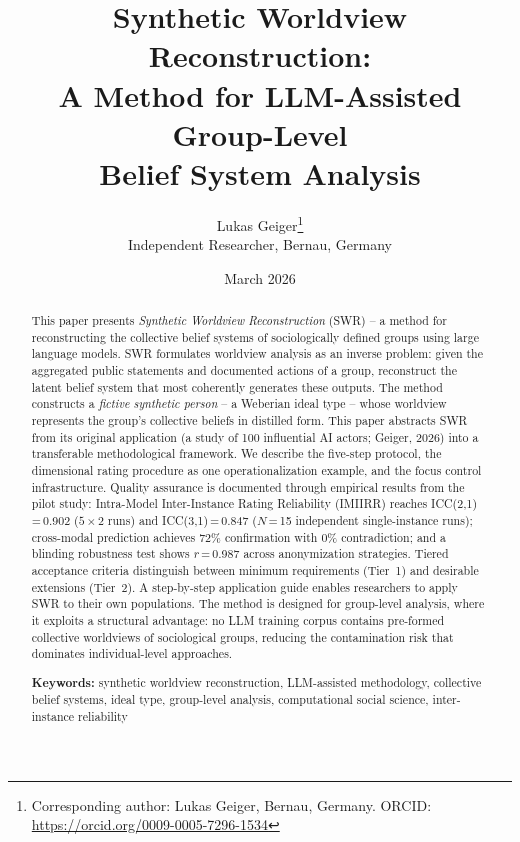 \documentclass[11pt,a4paper]{article}
\title{%
  \sffamily\bfseries
  Synthetic Worldview Reconstruction:\\[0.3em]
  \large A Method for LLM-Assisted Group-Level\\
  Belief System Analysis%
}
\author{%
  Lukas Geiger\thanks{Corresponding author: Lukas Geiger, Bernau, Germany. ORCID: \url{https://orcid.org/0009-0005-7296-1534}}\\[0.3em]
  \small Independent Researcher, Bernau, Germany
}
\date{March 2026}
\begin{document}
\maketitle
\thispagestyle{empty}

\begin{abstract}
\noindent
This paper presents \emph{Synthetic Worldview Reconstruction} (SWR) -- a method for reconstructing the collective belief systems of sociologically defined groups using large language models. SWR formulates worldview analysis as an inverse problem: given the aggregated public statements and documented actions of a group, reconstruct the latent belief system that most coherently generates these outputs. The method constructs a \emph{fictive synthetic person} -- a Weberian ideal type -- whose worldview represents the group's collective beliefs in distilled form. This paper abstracts SWR from its original application (a study of 100 influential AI actors; Geiger, 2026) into a transferable methodological framework. We describe the five-step protocol, the dimensional rating procedure as one operationalization example, and the focus control infrastructure. Quality assurance is documented through empirical results from the pilot study: Intra-Model Inter-Instance Rating Reliability (IMIIRR) reaches ICC(2,1)\,=\,0.902 ($5 \times 2$ runs) and ICC(3,1)\,=\,0.847 ($N$\,=\,15 independent single-instance runs); cross-modal prediction achieves 72\% confirmation with 0\% contradiction; and a blinding robustness test shows $r$\,=\,0.987 across anonymization strategies. Tiered acceptance criteria distinguish between minimum requirements (Tier~1) and desirable extensions (Tier~2). A step-by-step application guide enables researchers to apply SWR to their own populations. The method is designed for group-level analysis, where it exploits a structural advantage: no LLM training corpus contains pre-formed collective worldviews of sociological groups, reducing the contamination risk that dominates individual-level approaches.

\medskip
\noindent\textbf{Keywords:} synthetic worldview reconstruction, LLM-assisted methodology, collective belief systems, ideal type, group-level analysis, computational social science, inter-instance reliability
\end{abstract}

\newpage
\setcounter{page}{1}

\end{document}
